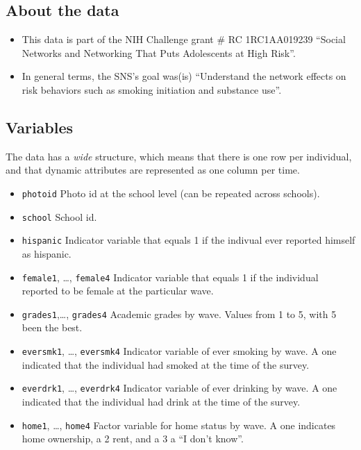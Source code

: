 \documentclass[
]{book}
\begin{document}
\hypertarget{about-the-data}{%
\subsection{About the data}\label{about-the-data}}

\begin{itemize}
\item
  This data is part of the NIH Challenge grant \# RC 1RC1AA019239 ``Social
  Networks and Networking That Puts Adolescents at High Risk''.
\item
  In general terms, the SNS's goal was(is) ``Understand the network effects on
  risk behaviors such as smoking initiation and substance use''.
\end{itemize}

\hypertarget{variables}{%
\subsection{Variables}\label{variables}}

The data has a \emph{wide} structure, which means that there is one row per individual,
and that dynamic attributes are represented as one column per time.

\begin{itemize}
\item
  \texttt{photoid} Photo id at the school level (can be repeated across schools).
\item
  \texttt{school} School id.
\item
  \texttt{hispanic} Indicator variable that equals 1 if the indivual ever reported
  himself as hispanic.
\item
  \texttt{female1}, \ldots, \texttt{female4} Indicator variable that equals 1 if the individual
  reported to be female at the particular wave.
\item
  \texttt{grades1},\ldots, \texttt{grades4} Academic grades by wave. Values from 1 to 5, with 5
  been the best.
\item
  \texttt{eversmk1}, \ldots, \texttt{eversmk4} Indicator variable of ever smoking by wave. A one
  indicated that the individual had smoked at the time of the survey.
\item
  \texttt{everdrk1}, \ldots, \texttt{everdrk4} Indicator variable of ever drinking by wave.
  A one indicated that the individual had drink at the time of the survey.
\item
  \texttt{home1}, \ldots, \texttt{home4} Factor variable for home status by wave. A one
  indicates home ownership, a 2 rent, and a 3 a ``I don't know''.
\end{itemize}
\end{document}
